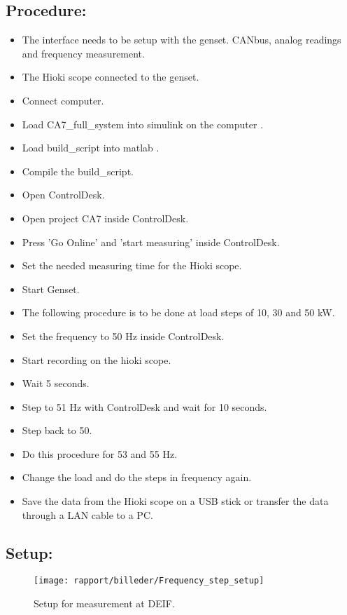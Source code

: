\subsection*{Procedure:}

\begin{itemize}
	\item The interface needs to be setup with the genset. CANbus, analog readings and frequency measurement.  
	\item The Hioki scope connected to the genset.
	\item Connect computer.
	\item Load CA7\_full\_system into simulink on the computer .
	\item Load build\_script into matlab . 
	\item Compile the build\_script.
	\item Open ControlDesk.
	\item Open project CA7 inside ControlDesk.
	\item Press 'Go Online' and 'start measuring' inside ControlDesk. 
	\item Set the needed measuring time for the Hioki scope.  
	\item Start Genset.
	\item The following procedure is to be done at load steps of 10, 30 and 50 kW.
	\item Set the frequency to 50 Hz inside ControlDesk.
	\item Start recording on the hioki scope.
	\item Wait 5 seconds.
	\item Step to 51 Hz with ControlDesk and wait for 10 seconds.
	\item Step back to 50.
	\item Do this procedure for 53 and 55 Hz. 
	\item Change the load and do the steps in frequency again.
	\item Save the data from the Hioki scope on a USB stick or transfer the data through a LAN cable to a PC.  

\end{itemize}


\subsection*{Setup:}
\begin{figure}[H]
\centering
\texttt{[image: rapport/billeder/Frequency\_step\_setup]}
\caption{Setup for measurement at DEIF.}
\label{fig:Frequency_step_setup}
\end{figure} 


